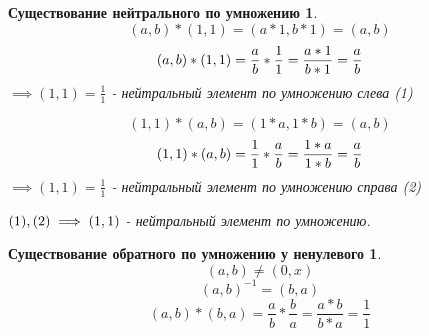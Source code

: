 \documentclass[14pt,a4paper,oneside,russian]{article}
\newtheorem*{axiom8}{Существование нейтрального по умножению}
\newtheorem*{axiom9}{Существование обратного по умножению у ненулевого}
\begin{document}
\begin{axiom8}
$$ (a, b) * (1, 1) = (a * 1, b * 1) = (a, b) $$
$$
(a, b) * (1, 1) = \frac{a}{b} * \frac{1}{1} = \frac{a * 1}{b * 1} = \frac{a}{b}
\newline
$$
$ \implies (1, 1) = \frac{1}{1} $ - нейтральный элемент по умножению слева (1)

$$ (1, 1) * (a, b) = (1 * a, 1 * b) = (a, b) $$
$$
(1, 1) * (a, b) = \frac{1}{1} * \frac{a}{b} = \frac{1 * a}{1 * b} = \frac{a}{b}
\newline
$$
$ \implies (1, 1) = \frac{1}{1} $ - нейтральный элемент по умножению справа (2)

$ \newline (1), (2) \implies (1, 1) $ - нейтральный элемент по умножению.
\end{axiom8}
\newpage

\begin{axiom9}
$$ (a, b) \neq (0, x) $$
$$ (a, b)^{-1} = (b, a) $$
$$ (a, b) * (b, a) = \frac{a}{b} * \frac{b}{a} = \frac{a * b}{b * a} = \frac{1}{1} $$
\end{axiom9}
\end{document}
